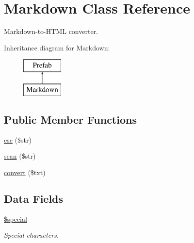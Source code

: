 \hypertarget{class_markdown}{}\section{Markdown Class Reference}
\label{class_markdown}


Markdown-\/to-\/\+H\+T\+ML converter.  


Inheritance diagram for Markdown\+:\begin{figure}[H]
\begin{center}
\leavevmode
\includegraphics[height=2.000000cm]{class_markdown}
\end{center}
\end{figure}
\subsection*{Public Member Functions}
\begin{DoxyCompactItemize}
\item 
\hyperlink{class_markdown_a5c55a8c8fce867d0889971aaaf590040}{esc} (\$str)
\item 
\hyperlink{class_markdown_a13c88b9c8e8002dfc54d002e47baf4fc}{scan} (\$str)
\item 
\hyperlink{class_markdown_a64ffc5ca8440ddf7e0f3b3f03c16edf2}{convert} (\$txt)
\end{DoxyCompactItemize}
\subsection*{Data Fields}
\begin{DoxyCompactItemize}
\item 
\hypertarget{class_markdown_aac9b8e6c2865946aa0c0155dfbd03c99}{}\label{class_markdown_aac9b8e6c2865946aa0c0155dfbd03c99} 
\hyperlink{class_markdown_aac9b8e6c2865946aa0c0155dfbd03c99}{\$special}
\begin{DoxyCompactList}\small\item\em Special characters. \end{DoxyCompactList}\end{DoxyCompactItemize}
